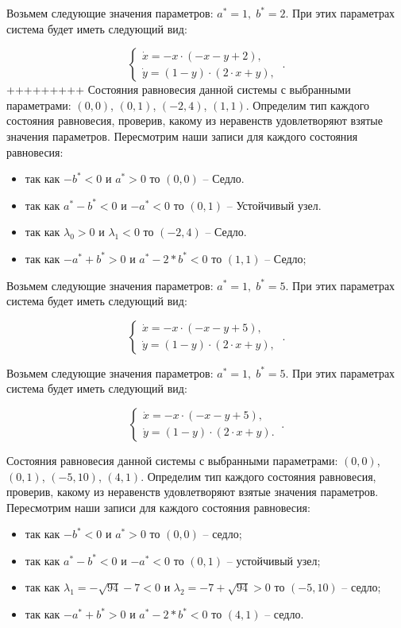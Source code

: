\begin{enumerate}
Возьмем следующие значения параметров:  $a^\ast = 1,\; b^\ast = 2$. При этих параметрах система будет иметь следующий вид: 

$$
\left \lbrace 
\begin{matrix} 
\dot{x} = -x \cdot (-x - y + 2), \\
\dot{y} = (1 - y) \cdot (2 \cdot x + y), \
\end{matrix} 
\right . .$$
+++++++++
Состояния равновесия данной системы с выбранными параметрами: $(0, 0)$, $(0, 1)$, $(-2, 4)$, $(1, 1)$. Определим тип каждого состояния равновесия, проверив, какому из неравенств удовлетворяют взятые значения параметров.  Пересмотрим наши записи для каждого состояния равновесия: 
\begin{itemize}
\item{ так как $-b^\ast  < 0 $ и $a^\ast > 0 $ то $(0, 0)$ -- Седло.}
\item{ так как $a^\ast - b^\ast  < 0 $ и $-a^\ast  < 0 $ то $(0, 1)$ -- Устойчивый узел.}
\item{ так как ${\lambda_{0}} > 0 $ и ${\lambda_{1}}  < 0 $ то $(-2, 4)$ -- Седло.}
\item{ так как $-a^\ast + b^\ast > 0 $ и $a^\ast - 2*b^\ast  < 0 $ то $(1, 1)$ -- Седло;}
\end{itemize} 


Возьмем следующие значения параметров:  $a^\ast = 1,\; b^\ast = 5$. При этих параметрах система будет иметь следующий вид: 

$$
\left \lbrace 
\begin{matrix} 
\dot{x} = -x \cdot (-x - y + 5), \\
\dot{y} = (1 - y) \cdot (2 \cdot x + y), \
\end{matrix} 
\right . .$$

\newpage

Возьмем следующие значения параметров:  $a^\ast = 1,\; b^\ast = 5$. При этих параметрах система будет иметь следующий вид: 

$$
\left \lbrace 
\begin{matrix} 
\dot{x} = -x \cdot (-x - y + 5), \\
\dot{y} = (1 - y) \cdot (2 \cdot x + y). \
\end{matrix} 
\right . .$$

Состояния равновесия данной системы с выбранными параметрами: $(0, 0)$, $(0, 1)$, $(-5, 10)$, $(4, 1)$. Определим тип каждого состояния равновесия, проверив, какому из неравенств удовлетворяют взятые значения параметров.  Пересмотрим наши записи для каждого состояния равновесия: 
\begin{itemize}
\item{ так как $-b^\ast  < 0 $ и $a^\ast > 0 $ то $(0, 0)$ -- седло;}
\item{ так как $a^\ast - b^\ast  < 0 $ и $-a^\ast  < 0 $ то $(0, 1)$ -- устойчивый узел;}
\item{ так как ${\lambda_{1}} = - \sqrt{94} - 7  < 0 $ и ${\lambda_{2}} = -7 + \sqrt{94} > 0 $ то $(-5, 10)$ -- седло;}
\item{ так как $-a^\ast + b^\ast > 0 $ и $a^\ast - 2*b^\ast  < 0 $ то $(4, 1)$ -- седло.}
\end{itemize} 


\end{enumerate}

